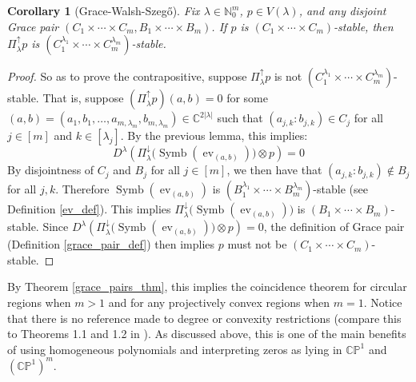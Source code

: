 \documentclass{article}
\newtheorem{corollary}[theorem]{Corollary}
\theoremstyle{definition}
\theoremstyle{plain}
\newcommand{\C}{\mathbb{C}}
\newcommand{\N}{\mathbb{N}}
\newcommand{\CP}{\mathbb{CP}}
\DeclareMathOperator{\Symb}{Symb}
\DeclareMathOperator{\ev}{ev}
\begin{document}
\begin{corollary}[Grace-Walsh-Szeg{\H{o}}]\label{gws_cor}
    Fix $\lambda \in \N_0^m$, $p \in V(\lambda)$, and any disjoint Grace pair $(C_1 \times \cdots \times C_m, B_1 \times \cdots \times B_m)$. If $p$ is $(C_1 \times \cdots \times C_m)$-stable, then $\Pi_\lambda^\uparrow p$ is $(C_1^{\lambda_1} \times \cdots \times C_m^{\lambda_m})$-stable.
\end{corollary}
\begin{proof}
    So as to prove the contrapositive, suppose $\Pi_\lambda^\uparrow p$ is not $(C_1^{\lambda_1} \times \cdots \times C_m^{\lambda_m})$-stable. That is, suppose $(\Pi_\lambda^\uparrow p)(a,b) = 0$ for some $(a,b) = (a_1,b_1,\ldots,a_{m,\lambda_m},b_{m,\lambda_m}) \in \C^{2|\lambda|}$ such that $(a_{j,k}:b_{j,k}) \in C_j$ for all $j \in [m]$ and $k \in [\lambda_j]$. By the previous lemma, this implies:
    \[
        D^\lambda\left(\Pi_\lambda^\downarrow\big(\Symb(\ev_{(a,b)})\big) \otimes p\right) = 0
    \]
    By disjointness of $C_j$ and $B_j$ for all $j \in [m]$, we then have that $(a_{j,k}:b_{j,k}) \not\in B_j$ for all $j,k$. Therefore $\Symb(\ev_{(a,b)})$ is $(B_1^{\lambda_1} \times \cdots \times B_m^{\lambda_m})$-stable (see Definition \ref{ev_def}). This implies $\Pi_\lambda^\downarrow\big(\Symb(\ev_{(a,b)})\big)$ is $(B_1 \times \cdots \times B_m)$-stable. Since $D^\lambda\left(\Pi_\lambda^\downarrow\big(\Symb(\ev_{(a,b)})\big) \otimes p\right) = 0$, the definition of Grace pair (Definition \ref{grace_pair_def}) then implies $p$ must not be $(C_1 \times \cdots \times C_m)$-stable.
\end{proof}

By Theorem \ref{grace_pairs_thm}, this implies the coincidence theorem for circular regions when $m > 1$ and for any projectively convex regions when $m = 1$. Notice that there is no reference made to degree or convexity restrictions (compare this to Theorems 1.1 and 1.2 in \cite{bb2}). As discussed above, this is one of the main benefits of using homogeneous polynomials and interpreting zeros as lying in $\CP^1$ and $(\CP^1)^m$.
\end{document}
